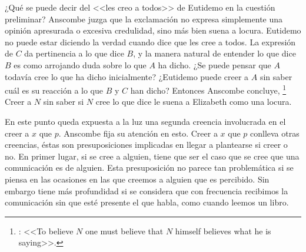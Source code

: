 ¿Qué se puede decir del <<les creo a todos>> de Eutidemo en la cuestión
preliminar? Anscombe juzga que la exclamación no expresa simplemente una opinión
apresurada o excesiva credulidad, sino más bien suena a
locura\autocite[5]{anscombe2008faith:tobelieve}. Eutidemo no puede estar
diciendo la verdad cuando dice que les cree a todos. La expresión de $C$ da
pertinencia a lo que dice $B$, y la manera natural de entender lo que dice $B$
es como arrojando duda sobre lo que $A$ ha dicho. ¿Se puede pensar que $A$
todavía cree lo que ha dicho inicialmente? ¿Eutidemo puede creer a $A$ sin saber
cuál es su reacción a lo que $B$ y $C$ han dicho? Entonces Anscombe concluye,
\footnote{\cite[5]{anscombe2008faith:tobelieve}: <<To believe $N$ one
  must believe that $N$ himself believes what he is saying>>.} Creer a $N$ sin
saber si $N$ cree lo que dice le suena a Elizabeth como una locura.

En este punto queda expuesta a la luz una segunda creencia involucrada en el
creer a $x$ que $p$. Anscombe fija su atención en esto. Creer a $x$ que $p$
conlleva otras creencias, éstas son presuposiciones implicadas en llegar a
plantearse si creer o no. En primer lugar, si se cree a alguien, tiene que ser
el caso que se cree que una comunicación es de
alguien\autocite[Cf.~][6]{anscombe2008faith:tobelieve}. Esta presuposición no
parece tan problemática si se piensa en las ocasiones en las que creemos a
alguien que es percibido. Sin embargo tiene más profundidad si se considera que
con frecuencia recibimos la comunicación sin que esté presente el que habla,
como cuando leemos un libro\autocite[Cf.~][5]{anscombe2008faith:tobelieve}.

